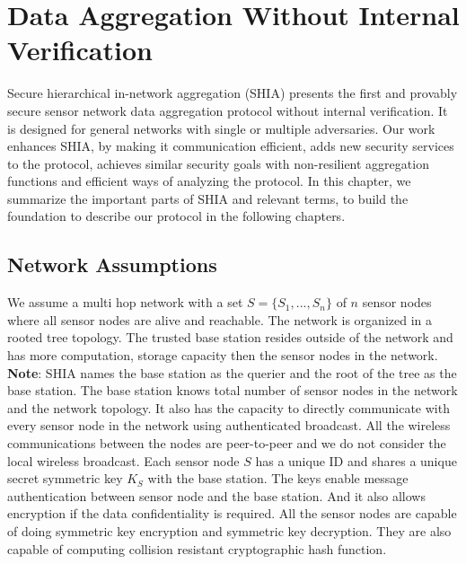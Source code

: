 \chapter{Data Aggregation Without Internal Verification} %
	\label{cha:Data Aggregation Without Internal Verification}

	Secure hierarchical in-network aggregation (SHIA) \cite{chan2006secure} presents the first and provably secure sensor network data aggregation protocol without internal verification.
	It is designed for general networks with single or multiple adversaries.
	Our work enhances SHIA, by making it communication efficient, adds new security services to the protocol, achieves similar security goals with non-resilient aggregation functions and efficient ways of analyzing the protocol.
	In this chapter, we summarize the important parts of SHIA and relevant terms, to build the foundation to describe our protocol in the following chapters.

\section{Network Assumptions}
	We assume a multi hop network with a set $ S = \{S_{1},...,S_{n}\} $ of $n$ sensor nodes where all sensor nodes are alive and reachable. 
	The network is organized in a rooted tree topology.
	The trusted base station resides outside of the network and has more computation, storage capacity then the sensor nodes in the network. 
	\textbf{Note}: SHIA names the base station as the querier and the root of the tree as the base station. 
	The base station knows total number of sensor nodes in the network and the network topology. 
	It also has the capacity to directly communicate with every sensor node in the network using authenticated broadcast.
	All the wireless communications between the nodes are peer-to-peer and we do not consider the local wireless broadcast.
	Each sensor node $S$ has a unique ID and shares a unique secret symmetric key $K_{S}$ with the base station.
	The keys enable message authentication between sensor node and the base station.
	And it also allows encryption if the data confidentiality is required.
	All the sensor nodes are capable of doing symmetric key encryption and symmetric key decryption.
	They are also capable of computing collision resistant cryptographic hash function. 

